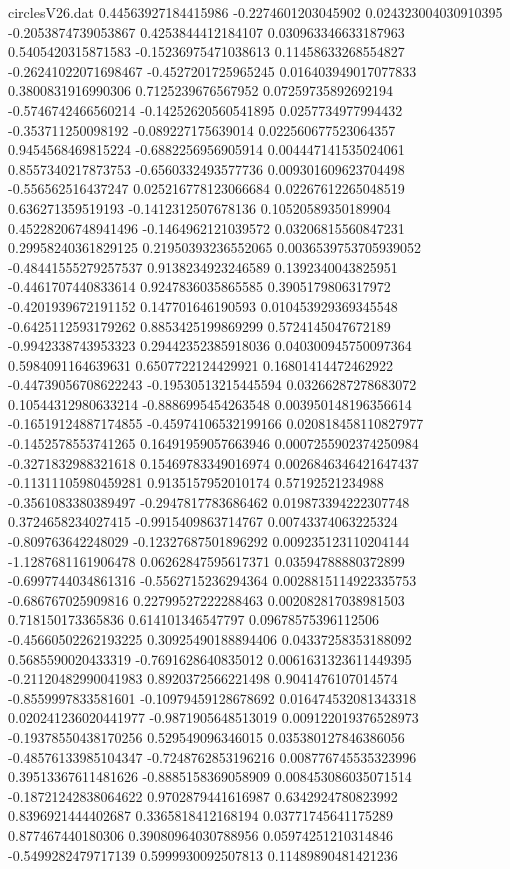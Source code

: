 \begin{filecontents}{circlesV26.dat}
0.44563927184415986	-0.2274601203045902	0.024323004030910395
-0.2053874739053867	0.4253844412184107	0.030963346633187963
0.5405420315871583	-0.15236975471038613	0.11458633268554827
-0.26241022071698467	-0.4527201725965245	0.016403949017077833
0.3800831916990306	0.7125239676567952	0.07259735892692194
-0.5746742466560214	-0.14252620560541895	0.0257734977994432
-0.353711250098192	-0.089227175639014	0.022560677523064357
0.9454568469815224	-0.6882256956905914	0.004447141535024061
0.8557340217873753	-0.6560332493577736	0.009301609623704498
-0.556562516437247	0.025216778123066684	0.02267612265048519
0.636271359519193	-0.1412312507678136	0.10520589350189904
0.45228206748941496	-0.1464962121039572	0.03206815560847231
0.29958240361829125	0.21950393236552065	0.0036539753705939052
-0.48441555279257537	0.9138234923246589	0.1392340043825951
-0.4461707440833614	0.9247836035865585	0.3905179806317972
-0.4201939672191152	0.147701646190593	0.010453929369345548
-0.6425112593179262	0.8853425199869299	0.5724145047672189
-0.9942338743953323	0.29442352385918036	0.040300945750097364
0.5984091164639631	0.6507722124429921	0.16801414472462922
-0.44739056708622243	-0.19530513215445594	0.03266287278683072
0.10544312980633214	-0.8886995454263548	0.003950148196356614
-0.16519124887174855	-0.45974106532199166	0.020818458110827977
-0.1452578553741265	0.16491959057663946	0.0007255902374250984
-0.3271832988321618	0.15469783349016974	0.0026846346421647437
-0.11311105980459281	0.9135157952010174	0.57192521234988
-0.3561083380389497	-0.2947817783686462	0.019873394222307748
0.3724658234027415	-0.9915409863714767	0.00743374063225324
-0.809763642248029	-0.12327687501896292	0.009235123110204144
-1.1287681161906478	0.06262847595617371	0.03594788880372899
-0.6997744034861316	-0.5562715236294364	0.0028815114922335753
-0.686767025909816	0.22799527222288463	0.002082817038981503
0.718150173365836	0.614101346547797	0.09678575396112506
-0.45660502262193225	0.30925490188894406	0.04337258353188092
0.5685590020433319	-0.7691628640835012	0.0061631323611449395
-0.21120482990041983	0.8920372566221498	0.9041476107014574
-0.8559997833581601	-0.10979459128678692	0.016474532081343318
0.020241236020441977	-0.9871905648513019	0.009122019376528973
-0.19378550438170256	0.529549096346015	0.035380127846386056
-0.48576133985104347	-0.7248762853196216	0.008776745535323996
0.39513367611481626	-0.8885158369058909	0.008453086035071514
-0.18721242838064622	0.9702879441616987	0.6342924780823992
0.8396921444402687	0.3365818412168194	0.03771745641175289
0.877467440180306	0.39080964030788956	0.05974251210314846
-0.5499282479717139	0.5999930092507813	0.11489890481421236

\end{filecontents}
